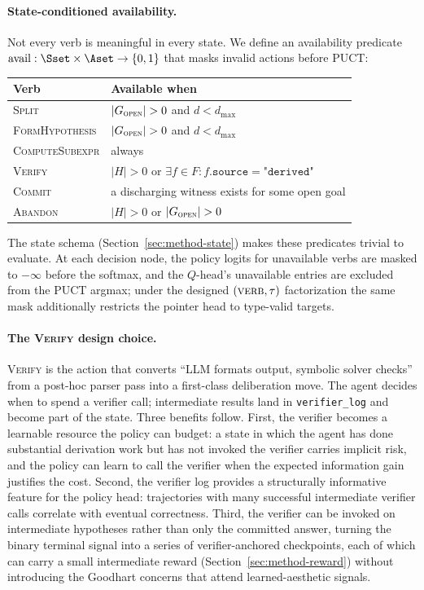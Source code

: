 \paragraph{State-conditioned availability.}
Not every verb is meaningful in every state. We define an availability
predicate $\mathrm{avail}: \Sset \times \Aset \to \{0, 1\}$ that masks
invalid actions before PUCT:

\begin{center}
\small
\begin{tabular}{@{}ll@{}}
\toprule
Verb & Available when \\
\midrule
\textsc{Split}           & $|G_{\textsc{open}}| > 0$ and $d < d_{\max}$ \\
\textsc{FormHypothesis}  & $|G_{\textsc{open}}| > 0$ and $d < d_{\max}$ \\
\textsc{ComputeSubexpr}  & always \\
\textsc{Verify}          & $|H| > 0$ or $\exists f \in F:
                           f.\texttt{source} = \texttt{"derived"}$ \\
\textsc{Commit}          & a discharging witness exists for some open goal \\
\textsc{Abandon}         & $|H| > 0$ or $|G_{\textsc{open}}| > 0$ \\
\bottomrule
\end{tabular}
\end{center}

The state schema (Section~\ref{sec:method-state}) makes these predicates
trivial to evaluate. At each decision node, the policy logits for
unavailable verbs are masked to $-\infty$ before the softmax, and the
$Q$-head's unavailable entries are excluded from the PUCT argmax; under the
designed $(\textsc{verb}, \tau)$ factorization the same mask additionally
restricts the pointer head to type-valid targets.

\paragraph{The \textsc{Verify} design choice.}
\textsc{Verify} is the action that converts ``LLM formats output,
symbolic solver checks'' from a post-hoc parser pass into a first-class
deliberation move. The agent decides when to spend a verifier call;
intermediate results land in \texttt{verifier\_log} and become part of
the state. Three benefits follow. First, the verifier becomes a
learnable resource the policy can budget: a state in which the agent
has done substantial derivation work but has not invoked the verifier
carries implicit risk, and the policy can learn to call the verifier
when the expected information gain justifies the cost. Second, the
verifier log provides a structurally informative feature for the policy
head: trajectories with many successful intermediate verifier calls
correlate with eventual correctness. Third, the verifier can be invoked
on intermediate hypotheses rather than only the committed answer,
turning the binary terminal signal into a series of verifier-anchored
checkpoints, each of which can carry a small intermediate reward
(Section~\ref{sec:method-reward}) without introducing the Goodhart
concerns that attend learned-aesthetic signals.


